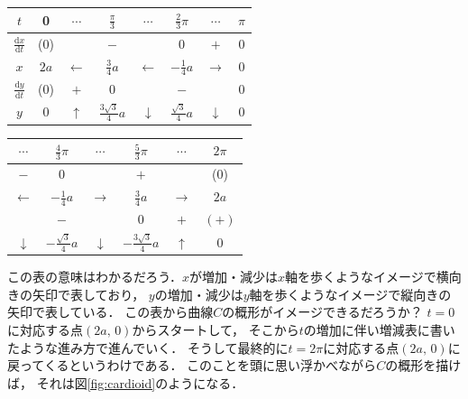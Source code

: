 \begin{table}[h]
\renewcommand{\arraystretch}{1.6}
\begin{flushleft}
\begin{tabular}{|c||c|c|c|c|c|c|c}
\hline
$t$ & 0 & $\cdots$  & $ \displaystyle \frac{ \pi }{3} $ & $\cdots$ 
& $ \displaystyle \frac{2}{3} \pi $ & $\cdots$ & \hspace{0.1cm} $\pi$ \hspace{0.1cm} \\ \hline
$ \displaystyle \frac{\mathrm{d} x }{\mathrm{d} t} $ & (0) & \multicolumn{3}{c|}{$-$} & 0 & $+$ & 0 \\ \hline
$x$ & $2a$ & $\leftarrow$ & $\displaystyle \frac{3}{4} a$ & $\leftarrow$ 
& $\displaystyle - \frac{1}{4} a$ & $\rightarrow$ & 0 \\ \hline
$\displaystyle \frac{\mathrm{d} y }{\mathrm{d} t}$  & (0) & $+$ & 0 &\multicolumn{3}{|c|}{$-$} & 0 \\ \hline
$y$ & 0 & $\uparrow$ & $ \displaystyle \frac{ 3 \sqrt{3} }{4} a$ & $\downarrow$ 
& $\displaystyle \frac{\sqrt{3} }{4} a$ & $\downarrow$ & 0 \\ \hline
\end{tabular}
\end{flushleft}
\end{table}
\vspace{-0.5cm}
\begin{table}[h]
\renewcommand{\arraystretch}{1.6}
\begin{flushright}
\begin{tabular}{c|c|c|c|c|c|}
\hline
$\cdots$ & $ \displaystyle \frac{4}{3} \pi$ & $ \cdots $ 
& $ \displaystyle \frac{5}{3} \pi $ & $ \cdots $ & $ 2 \pi $ \\ \hline
$-$ & 0 & \multicolumn{3}{c|}{$+$} & (0) \\ \hline
$\leftarrow$ & $ \displaystyle - \frac{1}{4} a$ & $\rightarrow$ 
& $ \displaystyle \frac{3}{4} a$ & $\rightarrow$ & $2a$ \\ \hline
\multicolumn{3}{c|}{$-$} & 0 & $+$ & $(+)$ \\ \hline
$\downarrow$ & $\displaystyle -\frac{ \sqrt{3}}{4} a $ & $\downarrow$ 
& $ \displaystyle -\frac{3\sqrt{3}}{4} a $ & $\uparrow$ & 0 \\ \hline
\end{tabular}
\end{flushright}
\end{table}
この表の意味はわかるだろう．$x$が増加・減少は$x$軸を歩くようなイメージで横向きの矢印で表しており，
$y$の増加・減少は$y$軸を歩くようなイメージで縦向きの矢印で表している．
この表から曲線$C$の概形がイメージできるだろうか？ $t=0$に対応する点$(2a, \, 0)$からスタートして，
そこから$t$の増加に伴い増減表に書いたような進み方で進んでいく．
そうして最終的に$t= 2 \pi$に対応する点$(2a, \, 0)$に戻ってくるというわけである．
このことを頭に思い浮かべながら$C$の概形を描けば，
それは図\ref{fig:cardioid}のようになる．

